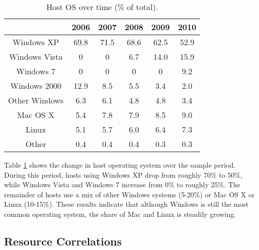 \documentclass[conference]{IEEEtran}
\begin{document}
{\begin{table}
\caption{Host OS over time (\% of total).}
\centering
\scriptsize
\begin{tabular}{|c|c|c|c|c|c|}
\hline
& 2006 & 2007 & 2008 & 2009 & 2010 \\
\hline
Windows XP & 69.8 & 71.5 & 68.6 & 62.5 & 52.9 \\
\hline
Windows Vista & 0 & 0 & 6.7 & 14.0 & 15.9 \\
\hline
Windows 7 & 0 & 0 & 0 & 0 & 9.2 \\
\hline
Windows 2000 & 12.9 & 8.5 & 5.5 & 3.4 & 2.0 \\
\hline
Other Windows & 6.3 & 6.1 & 4.8 & 4.8 & 3.4 \\
\hline
Mac OS X & 5.4 & 7.8 & 7.9 & 8.5 & 9.0 \\
\hline
Linux & 5.1 & 5.7 & 6.0 & 6.4 & 7.3 \\
\hline
Other & 0.4 & 0.4 & 0.4 & 0.3 & 0.3 \\
\hline
\end{tabular}
\label{os-type-table}
\end{table}

Table \ref{os-type-table} shows the change in host operating system over the sample period.  During this period, hosts using Windows XP drop from roughly 70\% to 50\%, while Windows Vista and Windows 7 increase from 0\% to roughly 25\%.  The remainder of hosts use a mix of other Windows systems (5-20\%) or Mac OS X or Linux (10-15\%).  These results indicate that although Windows is still the most common operating system, the share of Mac and Linux is steadily growing.
}{}

\subsection{Resource Correlations}
\label{sec-res-corr}
\end{document}
